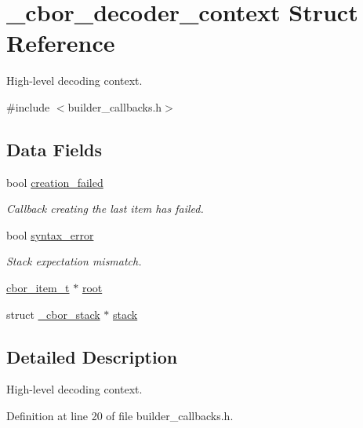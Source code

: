 \hypertarget{struct__cbor__decoder__context}{\section{\-\_\-cbor\-\_\-decoder\-\_\-context Struct Reference}
\label{struct__cbor__decoder__context}
}


High-\/level decoding context.  




{\ttfamily \#include $<$builder\-\_\-callbacks.\-h$>$}

\subsection*{Data Fields}
\begin{DoxyCompactItemize}
\item 
bool \hyperlink{struct__cbor__decoder__context_ada14322afd080c27f3ea76b3ba657505}{creation\-\_\-failed}
\begin{DoxyCompactList}\small\item\em Callback creating the last item has failed. \end{DoxyCompactList}\item 
bool \hyperlink{struct__cbor__decoder__context_ae34e7cc9b435a63bc0e92c425279db84}{syntax\-\_\-error}
\begin{DoxyCompactList}\small\item\em Stack expectation mismatch. \end{DoxyCompactList}\item 
\hyperlink{structcbor__item__t}{cbor\-\_\-item\-\_\-t} $\ast$ \hyperlink{struct__cbor__decoder__context_ad4c1540245b6241bc7aa3f7ade2fbf5a}{root}
\item 
struct \hyperlink{struct__cbor__stack}{\-\_\-cbor\-\_\-stack} $\ast$ \hyperlink{struct__cbor__decoder__context_af21635162948fc488da3c1625f1bc278}{stack}
\end{DoxyCompactItemize}


\subsection{Detailed Description}
High-\/level decoding context. 

Definition at line 20 of file builder\-\_\-callbacks.\-h.



